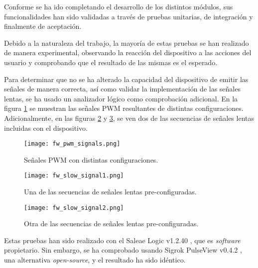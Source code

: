 Conforme se ha ido completando el desarrollo de los distintos módulos, sus funcionalidades han sido validadas a través de pruebas unitarias, de integración y finalmente de aceptación.

Debido a la naturaleza del trabajo, la mayoría de estas pruebas se han realizado de manera experimental, observando la reacción del dispositivo a las acciones del usuario y comprobando que el resultado de las mismas es el esperado.

Para determinar que no se ha alterado la capacidad del dispositivo de emitir las señales de manera correcta, así como validar la implementación de las señales lentas, se ha usado un analizador lógico como comprobación adicional. En la figura \ref{fig:fw_pwm_signals} se muestran las señales PWM resultantes de distintas configuraciones. Adicionalmente, en las figuras \ref{fig:fw_slow_signal1} y \ref{fig:fw_slow_signal2}, se ven dos de las secuencias de señales lentas incluidas con el dispositivo.

\begin{figure}[h!]
    \centering
    \texttt{[image: fw\_pwm\_signals.png]}
    \caption{Señales PWM con distintas configuraciones.}
    \label{fig:fw_pwm_signals}
\end{figure}

\begin{figure}[h!]
    \centering
    \texttt{[image: fw\_slow\_signal1.png]}
    \caption{Una de las secuencias de señales lentas pre-configuradas.}
    \label{fig:fw_slow_signal1}
\end{figure}

\begin{figure}[h!]
    \centering
    \texttt{[image: fw\_slow\_signal2.png]}
    \caption{Otra de las secuencias de señales lentas pre-configuradas.}
    \label{fig:fw_slow_signal2}
\end{figure}

Estas pruebas han sido realizado con el Saleae Logic v1.2.40 \cite{saleae-logic}, que es \textit{software} propietario. Sin embargo, se ha comprobado usando Sigrok PulseView v0.4.2 \cite{sigrok-pv}, una alternativa \textit{open-source}, y el resultado ha sido idéntico.
